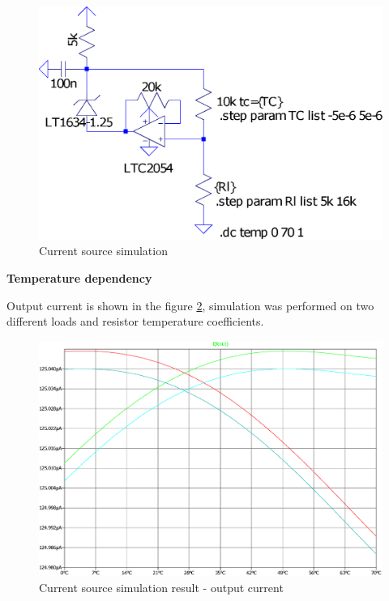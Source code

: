         \begin{figure}[H]
            \centering
            \includegraphics[width=0.6\paperwidth]{img/06/current_source.eps}
            \caption{Current source simulation}
            \label{current_source_simulation}
        \end{figure}

        \bigskip\textbf{Temperature dependency}
        
        Output current is shown in the figure \ref{current_source_simulation_result}, simulation was performed on two different loads and resistor temperature coefficients.
        \begin{figure}[H]
            \centering
            \includegraphics[width=0.6\paperwidth]{img/06/current_source_result.eps}
            \caption{Current source simulation result - output current}
            \label{current_source_simulation_result}
        \end{figure}

